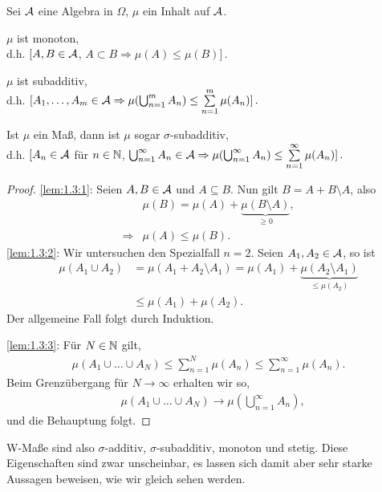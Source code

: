 \begin{lem}
\label{lem:1.3}
Sei $\AA$ eine Algebra in $\Omega $, $\mu$ ein Inhalt auf
$\AA$.
\begin{propenum}
\item\label{lem:1.3:1} $\mu $ ist monoton, \\ d.h. $[A,B \in \AA$, $A \subset B
  \Rightarrow \mu (A) \leq \mu (B) ]\, .$
\item\label{lem:1.3:2} $\mu$ ist subadditiv, \\ d.h. $[A_{1}, \ldots , A_{m}
\in \AA \Rightarrow \mu ( \bigcup^{m}_{n=1}A_{n}) \leq
  \sum\limits^{m}_{n=1} \mu (A_{n})]\, .$
\item\label{lem:1.3:3}
Ist $\mu$ ein Maß, dann ist $\mu$ sogar $\sigma$-subadditiv, \\
d.h. $[A_{n} \in \AA$ für $n\in\N$, $
\bigcup^{\infty}_{n=1}A_{n}\in \AA \Rightarrow
\mu ( \bigcup^{\infty}_{n=1} A_{n}) \leq
\sum\limits^{\infty}_{n=1} \mu (A_{n})]\, .$\fishhere
\end{propenum}
\end{lem}
\begin{proof}
\ref{lem:1.3:1}: Seien $A,B\in\AA$ und $A\subseteq B$. Nun gilt
$B=A+B\setminus A$, also
\begin{align*}
&\mu(B) = \mu(A)+\underbrace{\mu(B\setminus A)}_{\ge 0},\\
\Rightarrow &\mu(A)\le \mu(B).
\end{align*}
\ref{lem:1.3:2}: Wir untersuchen den Spezialfall $n=2$. Seien $A_1,A_2\in\AA$,
so ist
\begin{align*}
\mu(A_1\cup A_2) &= \mu(A_1+A_2\setminus A_1) = \mu(A_1) +
\underbrace{\mu(A_2\setminus A_1)}_{\le\mu(A_2)}
\\ &\le \mu(A_1)+\mu(A_2).
\end{align*}
Der allgemeine Fall folgt durch Induktion.

\noindent\ref{lem:1.3:3}: Für $N\in\N$ gilt,
\begin{align*}
\mu(A_1\cup \ldots \cup A_N) \le \sum\limits_{n=1}^N \mu(A_n) \le
\sum\limits_{n=1}^\infty \mu(A_n).
\end{align*}
Beim Grenzübergang für $N\to\infty$ erhalten wir so,
\begin{align*}
&\mu(A_1\cup \ldots \cup A_N) \to \mu\left(\bigcup_{n=1}^\infty A_n\right),
\end{align*}
und die Behauptung folgt.\qedhere
\end{proof}

W-Maße sind also $\sigma$-additiv, $\sigma$-subadditiv, monoton und stetig.
Diese Eigenschaften sind zwar unscheinbar, es lassen sich damit aber sehr
starke Aussagen beweisen, wie wir gleich sehen werden.

